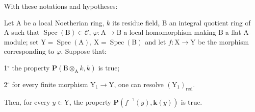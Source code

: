 With these notations and hypotheses:

\begin{proposition}[7.9.8]
\label{IV.7.9.8}
Let $\mathrm{A}$ be a local Noetherian ring, $k$ its residue field, $\mathrm{B}$ an integral quotient ring of $\mathrm{A}$ such that $\operatorname{Spec}(\mathrm{B})\in\mathcal{C}$, $\varphi:\mathrm{A}\to\mathrm{B}$ a local homomorphism making $\mathrm{B}$ a flat $\mathrm{A}$-module; set $\mathrm{Y}=\operatorname{Spec}(\mathrm{A})$, $\mathrm{X}=\operatorname{Spec}(\mathrm{B})$ and let $f:\mathrm{X}\to\mathrm{Y}$ be the morphism corresponding to $\varphi$. Suppose that:

1${}^\circ$ the property $\boldsymbol{P}(\mathrm{B}\otimes_\mathrm{A} k,k)$ is true;

2${}^\circ$ for every finite morphism $\mathrm{Y}_1\to\mathrm{Y}$, one can resolve $(\mathrm{Y}_1)_{\mathrm{red}}$.

Then, for every $y\in\mathrm{Y}$, the property $\boldsymbol{P}(f^{-1}(y),\boldsymbol{k}(y))$ is true.
\end{proposition}

